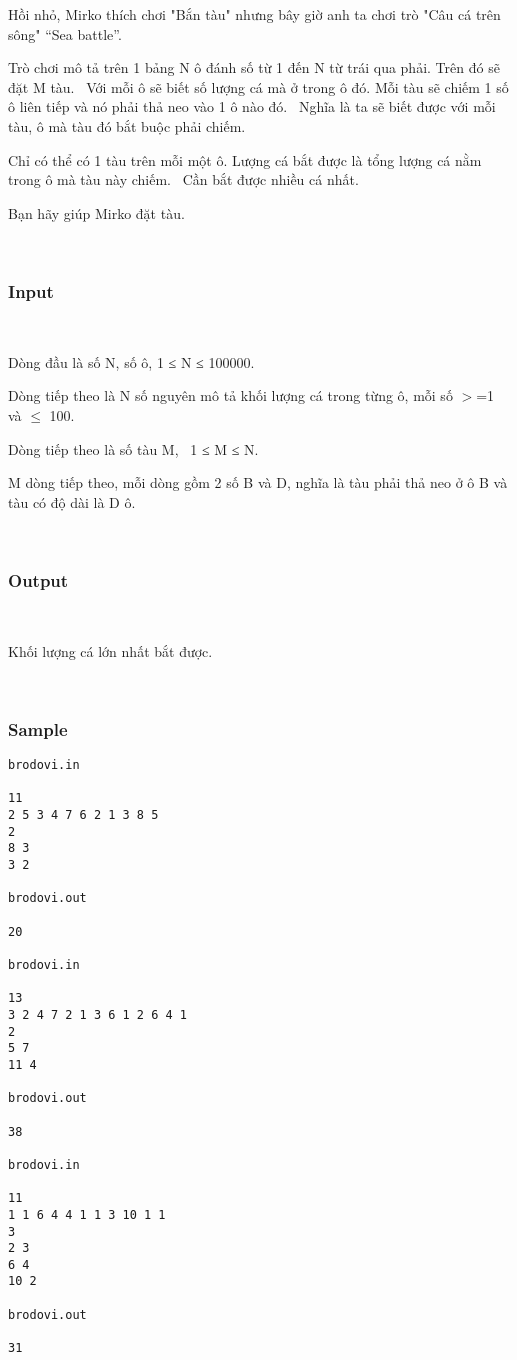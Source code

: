 

Hồi nhỏ, Mirko thích chơi "Bắn tàu" nhưng bây giờ anh ta chơi trò "Câu cá trên sông" “Sea battle”.

Trò chơi mô tả trên 1 bảng N ô đánh số từ 1 đến N từ trái qua phải. Trên đó sẽ đặt M tàu.  Với mỗi ô sẽ biết số lượng cá mà ở trong ô đó. Mỗi tàu sẽ chiếm 1 số ô liên tiếp và nó phải thả neo vào 1 ô nào đó.  Nghĩa là ta sẽ biết được với mỗi tàu, ô mà tàu đó bắt buộc phải chiếm.

Chỉ có thể có 1 tàu trên mỗi một ô. Lượng cá bắt được là tổng lượng cá nằm trong ô mà tàu này chiếm.  Cần bắt được nhiều cá nhất.

Bạn hãy giúp Mirko đặt tàu.

 

\subsubsection{Input}

 

Dòng đầu là số N, số ô, 1 ≤ N ≤ 100000.

Dòng tiếp theo là N số nguyên mô tả khối lượng cá trong từng ô, mỗi số $>$=1 và  $\le$ 100.

Dòng tiếp theo là số tàu M,  1 ≤ M ≤ N.

M dòng tiếp theo, mỗi dòng gồm 2 số B và D, nghĩa là tàu phải thả neo ở ô B và tàu có độ dài là D ô.

 

\subsubsection{Output}

 

Khối lượng cá lớn nhất bắt được.

 

\subsubsection{Sample}
\begin{verbatim}
brodovi.in 
 
11 
2 5 3 4 7 6 2 1 3 8 5 
2 
8 3 
3 2 
 
brodovi.out 
 
20 

brodovi.in 
 
13 
3 2 4 7 2 1 3 6 1 2 6 4 1 
2 
5 7 
11 4 
 
brodovi.out 
 
38

brodovi.in 
 
11 
1 1 6 4 4 1 1 3 10 1 1 
3 
2 3 
6 4 
10 2 
 
brodovi.out 
 
31 
\end{verbatim}

 
